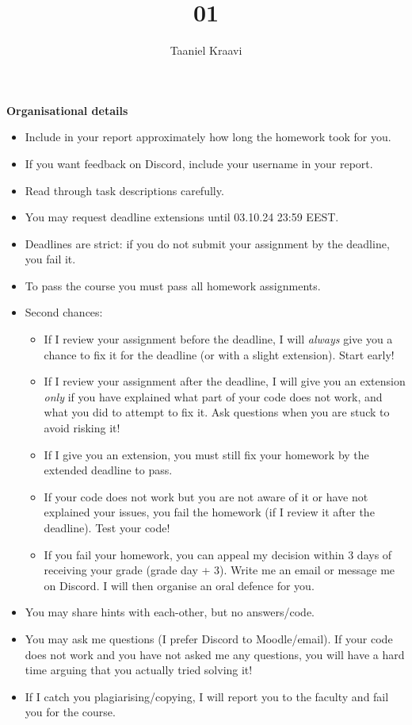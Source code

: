 \documentclass{homework}
\title{01}
\author{Taaniel Kraavi}
\date{\DTMdate{2024-10-06}}
\begin{document}
\maketitle

\textbf{Organisational details}

\begin{itemize}
  \item Include in your report approximately how long the homework took for you.
  \item If you want feedback on Discord, include your username in your report.
  \item Read through task descriptions carefully.
  \item You may request deadline extensions until 03.10.24 23:59 EEST.
  \item Deadlines are strict: if you do not submit your assignment by the deadline, you fail it.
  \item To pass the course you must pass all homework assignments.
  \item Second chances:
  \begin{itemize}
    \item If I review your assignment before the deadline, I will \emph{always} give you a chance to fix it for the deadline (or with a slight extension).
    Start early!
    \item If I review your assignment after the deadline, I will give you an extension \emph{only} if you have explained what part of your code does not work, and what you did to attempt to fix it.
    Ask questions when you are stuck to avoid risking it!
    \item If I give you an extension, you must still fix your homework by the extended deadline to pass.
    \item If your code does not work but you are not aware of it or have not explained your issues, you fail the homework (if I review it after the deadline).
    Test your code!
    \item If you fail your homework, you can appeal my decision within 3 days of receiving your grade (grade day + 3).
    Write me an email or message me on Discord.
    I will then organise an oral defence for you.
  \end{itemize}
  \item You may share hints with each-other, but no answers/code.
  \item You may ask me questions (I prefer Discord to Moodle/email).
  If your code does not work and you have not asked me any questions, you will have a hard time arguing that you actually tried solving it!
  \item If I catch you plagiarising/copying, I will report you to the faculty and fail you for the course.
\end{itemize}
\end{document}
